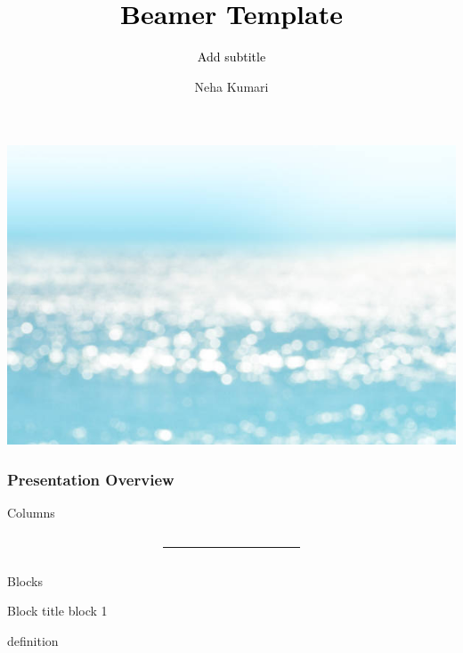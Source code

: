 \documentclass[8pt,aspectratio=169]{beamer}
\title{\textcolor{black}{Beamer Template}}
\subtitle{\textcolor{black}{Add subtitle }}
\author{Neha Kumari}
\institute{IIT Delhi}
\date{}
\begin{document}
{
    {
    \includegraphics[width=\paperwidth,height=\paperheight]{ocean5.jpg}} \begin{frame} 
    \maketitle 	 
 \end{frame}
}
\begin{frame}
	\frametitle{Presentation Overview}

	
	
\end{frame}
\begin{frame}{Columns}
\begin{columns}[T]
	\begin{column}{0.49\textwidth}
	\small	\blindtext
	\end{column}
\begin{column}{0.01\textwidth}
	\rule{0.1mm}{0.7\textheight}
\end{column}
	\begin{column}{0.49\textwidth}
		\small	\blindtext
	\end{column}
\end{columns}
\end{frame}
\begin{frame}{Blocks}
	\begin{block}{Block title}
		block 1
	\end{block}
\begin{definition}
	definition
\end{definition}
\end{frame}
\end{document}
